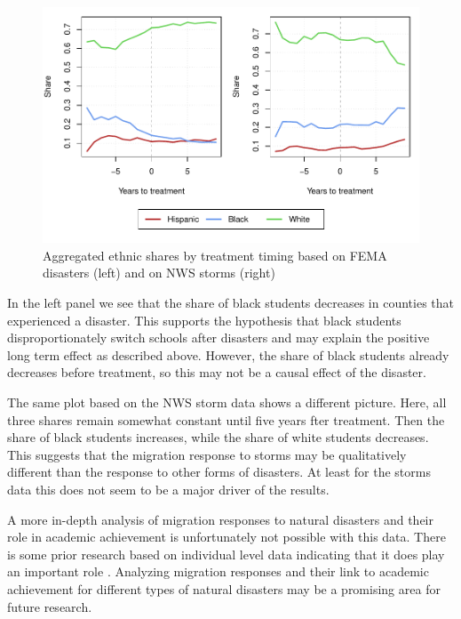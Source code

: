 \begin{figure}[!h]
	\centering
	\includegraphics[scale=1]{"../Code & Data/EthnicComposition.pdf"}
	\caption{Aggregated ethnic shares by treatment timing based on FEMA disasters (left) and on NWS storms (right)}
	\label{EthnicComposition}
\end{figure}

In the left panel we see that the share of black students decreases in counties that experienced a disaster. This supports the hypothesis that black students disproportionately switch schools after disasters and may explain the positive long term effect as described above. However, the share of black students already decreases before treatment, so this may not be a causal effect of the disaster.

The same plot based on the NWS storm data shows a different picture. Here, all three shares remain somewhat constant until five years fter treatment. Then the share of black students increases, while the share of white students decreases. This suggests that the migration response to storms may be qualitatively different than the response to other forms of disasters. At least for the storms data this does not seem to be a major driver of the results.

A more in-depth analysis of migration responses to natural disasters and their role in academic achievement is unfortunately not possible with this data. There is some prior research based on individual level data indicating that it does play an important role \citep[for example][]{Sacerdote_2012}. Analyzing migration responses and their link to academic achievement for different types of natural disasters may be a promising area for future research.


